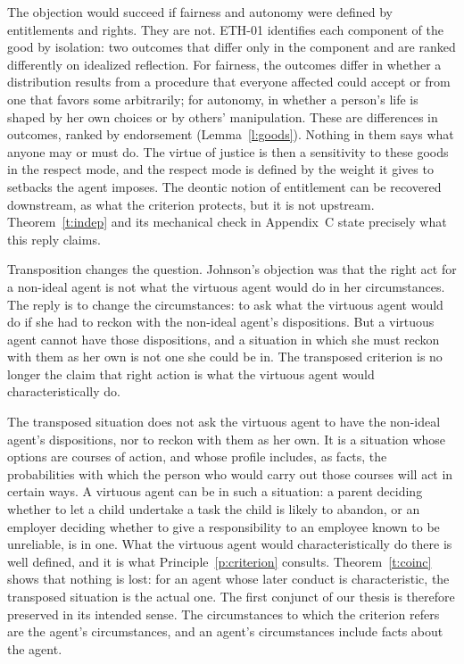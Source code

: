 \documentclass{situationist-preprint}
\begin{document}
\begin{reply}
The objection would succeed if fairness and autonomy were defined by entitlements and rights. They are not. ETH-01 identifies each component of the good by isolation: two outcomes that differ only in the component and are ranked differently on idealized reflection. For fairness, the outcomes differ in whether a distribution results from a procedure that everyone affected could accept or from one that favors some arbitrarily; for autonomy, in whether a person's life is shaped by her own choices or by others' manipulation. These are differences in outcomes, ranked by endorsement (Lemma~\ref{l:goods}). Nothing in them says what anyone may or must do. The virtue of justice is then a sensitivity to these goods in the respect mode, and the respect mode is defined by the weight it gives to setbacks the agent imposes. The deontic notion of entitlement can be recovered downstream, as what the criterion protects, but it is not upstream. Theorem~\ref{t:indep} and its mechanical check in Appendix~C state precisely what this reply claims.
\end{reply}

\begin{objection}\label{o:johnson}
Transposition changes the question. Johnson's objection was that the right act for a non-ideal agent is not what the virtuous agent would do in her circumstances. The reply is to change the circumstances: to ask what the virtuous agent would do if she had to reckon with the non-ideal agent's dispositions. But a virtuous agent cannot have those dispositions, and a situation in which she must reckon with them as her own is not one she could be in. The transposed criterion is no longer the claim that right action is what the virtuous agent would characteristically do.
\end{objection}

\begin{reply}
The transposed situation does not ask the virtuous agent to have the non-ideal agent's dispositions, nor to reckon with them as her own. It is a situation whose options are courses of action, and whose profile includes, as facts, the probabilities with which the person who would carry out those courses will act in certain ways. A virtuous agent can be in such a situation: a parent deciding whether to let a child undertake a task the child is likely to abandon, or an employer deciding whether to give a responsibility to an employee known to be unreliable, is in one. What the virtuous agent would characteristically do there is well defined, and it is what Principle~\ref{p:criterion} consults. Theorem~\ref{t:coinc} shows that nothing is lost: for an agent whose later conduct is characteristic, the transposed situation is the actual one. The first conjunct of our thesis is therefore preserved in its intended sense. The circumstances to which the criterion refers are the agent's circumstances, and an agent's circumstances include facts about the agent.
\end{reply}
\end{document}
